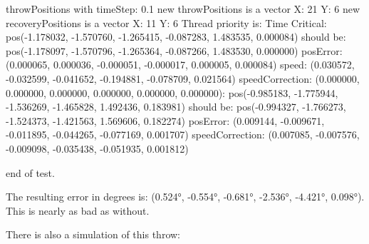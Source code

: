throwPositions with timeStep:  0.1\newline 
new throwPositions is a vector X: 21 Y:  6\newline 
new recoveryPositions is a vector X: 11 Y:  6\newline 
Thread priority is: Time Critical\newline 
[0.000000s - Step 0/21]:\newline 
\hspace{1cm}         pos(-1.178032, -1.570760, -1.265415, -0.087283, 1.483535, 0.000084) should be:\newline 
\hspace{1cm}         pos(-1.178097, -1.570796, -1.265364, -0.087266, 1.483530, 0.000000)\newline 
\hspace{1cm}         posError: (0.000065, 0.000036, -0.000051, -0.000017, 0.000005, 0.000084)\newline 
\hspace{1cm}         speed: (0.030572, -0.032599, -0.041652, -0.194881, -0.078709, 0.021564)\newline 
\hspace{1cm}         speedCorrection: (0.000000, 0.000000, 0.000000, 0.000000, 0.000000, 0.000000)\newline 
[2.000000s - Step 20/21]:
\hspace{1cm}         pos(-0.985183, -1.775944, -1.536269, -1.465828, 1.492436, 0.183981) should be:\newline 
\hspace{1cm}         pos(-0.994327, -1.766273, -1.524373, -1.421563, 1.569606, 0.182274)\newline 
\hspace{1cm}         posError: (0.009144, -0.009671, -0.011895, -0.044265, -0.077169, 0.001707)\newline 
\hspace{1cm}         speedCorrection: (0.007085, -0.007576, -0.009098, -0.035438, -0.051935, 0.001812)\newline 
 
end of test.\newline 

The resulting error in degrees is: (0.524°, -0.554°, -0.681°, -2.536°, -4.421°, 0.098°). This is nearly as bad as without.\newline 

There is also a simulation of this throw:\newline 

